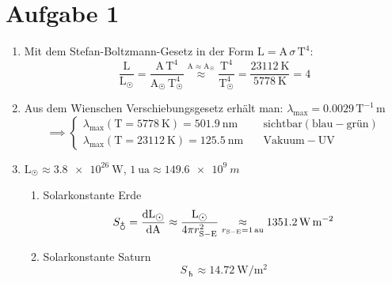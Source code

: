 \documentclass[11pt,a4paper]{scrartcl}
\newcommand{\Lum}{\mathrm{L}}
\newcommand{\Area}{\mathrm{A}}
\newcommand{\Temp}{\mathrm{T}}
\newcommand{\lambdamax}{\lambda_{\mathrm{max}}}
\begin{document}
\section*{Aufgabe 1}

\begin{enumerate}[label=\textbf{\large(\alph*)}]

\item
    Mit dem Stefan-Boltzmann-Gesetz in der Form $\Lum = \Area\,\sigma\,\Temp^4$:
    \begin{equation*}
        \frac{\Lum}{\Lum_{\astrosun}} =
        \frac{\Area\,\Temp^4}{\Area_{\astrosun}\,\Temp_{\astrosun}^4}
        \overset{\Area\approx\Area_{\astrosun}}{\approx}
        \frac{\Temp^4}{\Temp_{\astrosun}^4} =
        \frac{\SI{23112}{\kelvin}}{\SI{5778}{\kelvin}} = 4
    \end{equation*}

\vspace*{\baselineskip}

\item
    Aus dem Wienschen Verschiebungsgesetz erhält man:
    $\lambdamax = 0.0029\,\Temp^{-1}\,\si{\metre}$
    \begin{equation*}
        \implies
        \begin{cases}
            \lambdamax(\Temp=\SI{5778}{\kelvin}) = \SI{501.9}{\nano\metre} &
            \quad \mathrm{sichtbar (blau-grün)} \\
            \lambdamax(\Temp=\SI{23112}{\kelvin}) = \SI{125.5}{\nano\metre} &
            \quad \mathrm{Vakuum-UV}
        \end{cases}
    \end{equation*}

\vspace*{\baselineskip}

\item
    $\Lum_{\astrosun}\approx\SI{3.8e26}{\watt}$,
    $\SI{1}{\astronomicalunit}\approx\SI{149.6e9}{m}$
    \begin{enumerate}[label=\textbf{(\roman*)}]
        \item Solarkonstante Erde
            \begin{equation*}
                S_{\earth} = \dv{\Lum_{\astrosun}}{\Area} \approx
                \frac{\Lum_{\astrosun}}{4\pi r_{\mathrm{S-E}}^2}
                \underset{r_{\mathrm{S-E}}=\SI{1}{\astronomicalunit}}{\approx}
                \SI{1351.2}{\watt\per\metre\squared}
            \end{equation*}

        \item Solarkonstante Saturn
            \begin{equation*}
                S_{\saturn} \approx
                \SI{14.72}{\watt\per\metre\squared}
            \end{equation*}
    \end{enumerate}


\end{enumerate}
\end{document}
